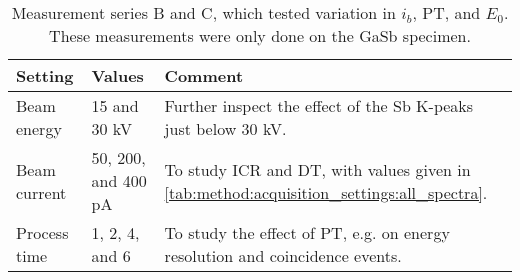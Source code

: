 \begin{table}[htbp]
    \begin{center}
        \caption{
            Measurement series B and C, which tested variation in $i_b$, PT, and $E_0$.
            These measurements were only done on the GaSb specimen.
        }
        \renewcommand*{\arraystretch}{1.2}
        \label{tab:method:acquisition_settings:other}
        \begin{tabular}{p{2cm}p{3cm}p{8.6cm}}
            \hline
            \textbf{Setting} & \textbf{Values}     & \textbf{Comment}                                                                               \\
            \hline
            Beam energy      & 15 and 30 kV        & Further inspect the effect of the Sb K-peaks just below 30 kV.                                 \\
            Beam current     & 50, 200, and 400 pA & To study ICR and DT, with values given in \cref{tab:method:acquisition_settings:all_spectra}. \\
            Process time     & 1, 2, 4, and 6      & To study the effect of PT, e.g. on energy resolution and coincidence events.                   \\
            \hline
        \end{tabular}
    \end{center}
\end{table}
